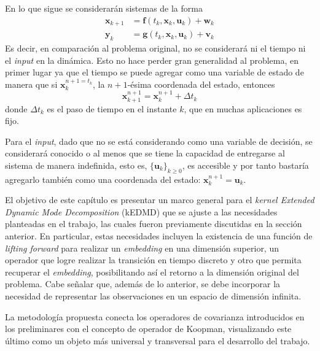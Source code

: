 En lo que sigue se considerarán sistemas de la forma
\begin{equation}
	\begin{aligned}
		\mathbf{x}_{k+1} &= \mathbf{f}(t_k, \mathbf{x}_k, \mathbf{u}_k) + \mathbf{w}_k \\
		\mathbf{y}_k &= \mathbf{g}(t_k, \mathbf{x}_k, \mathbf{u}_k) + \mathbf{v}_k 
	\end{aligned}
	\label{eq:no_lin_dis_chap3}
\end{equation}
Es decir, en comparación al problema original, no se considerará ni el tiempo ni el \textit{input} en la dinámica. Esto no hace perder gran generalidad al problema, en primer lugar ya que el tiempo se puede agregar como una variable de estado de manera que si $\mathbf{x}_{k}^{n+1 = t_k}$, la $n+1$-ésima coordenada del estado, entonces 
\begin{equation*}
    \mathbf{x}_{k+1}^{n+1} = \mathbf{x}_{k}^{n+1} + \Delta t_k
\end{equation*}
donde $\Delta t_k$ es el paso de tiempo en el instante $k$, que en muchas aplicaciones es fijo. 

Para el \textit{input}, dado que no se está considerando como una variable de decisión, se considerará conocido o al menos que se tiene la capacidad de entregarse al sistema de manera indefinida, esto es, $\{ \mathbf{u}_k \}_{k \geq 0}$, es accesible y por tanto bastaría agregarlo también como una coordenada del estado: $\mathbf{x}_{k}^{n+1} = \mathbf{u}_k$.

El objetivo de este capítulo es presentar un marco general para el \textit{kernel Extended Dynamic Mode Decomposition} (kEDMD) que se ajuste a las necesidades planteadas en el trabajo, las cuales fueron previamente discutidas en la sección anterior. En particular, estas necesidades incluyen la existencia de una función de \textit{lifting forward} para realizar un \textit{embedding} en una dimensión superior, un operador que logre realizar la transición en tiempo discreto y otro que permita recuperar el \textit{embedding}, posibilitando así el retorno a la dimensión original del problema. Cabe señalar que, además de lo anterior, se debe incorporar la necesidad de representar las observaciones en un espacio de dimensión infinita.

La metodología propuesta conecta los operadores de covarianza introducidos en los preliminares con el concepto de operador de Koopman, visualizando este último como un objeto más universal y transversal para el desarrollo del trabajo. 


